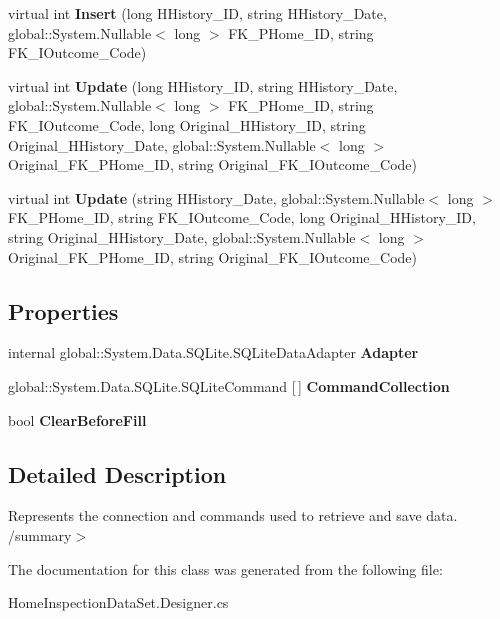 \begin{DoxyCompactItemize}
virtual int {\bfseries Insert} (long H\+History\+\_\+\+ID, string H\+History\+\_\+\+Date, global\+::\+System.\+Nullable$<$ long $>$ F\+K\+\_\+\+P\+Home\+\_\+\+ID, string F\+K\+\_\+\+I\+Outcome\+\_\+\+Code)
\item 
\mbox{\label{class_a_f_h___scheduler_1_1_home_inspection_data_set_table_adapters_1_1_home___history_table_adapter_a3843d8d80b5396ba0462ae6926d66d0a}} 
virtual int {\bfseries Update} (long H\+History\+\_\+\+ID, string H\+History\+\_\+\+Date, global\+::\+System.\+Nullable$<$ long $>$ F\+K\+\_\+\+P\+Home\+\_\+\+ID, string F\+K\+\_\+\+I\+Outcome\+\_\+\+Code, long Original\+\_\+\+H\+History\+\_\+\+ID, string Original\+\_\+\+H\+History\+\_\+\+Date, global\+::\+System.\+Nullable$<$ long $>$ Original\+\_\+\+F\+K\+\_\+\+P\+Home\+\_\+\+ID, string Original\+\_\+\+F\+K\+\_\+\+I\+Outcome\+\_\+\+Code)
\item 
\mbox{\label{class_a_f_h___scheduler_1_1_home_inspection_data_set_table_adapters_1_1_home___history_table_adapter_a89be3cae6fc1e831349998e36e455e00}} 
virtual int {\bfseries Update} (string H\+History\+\_\+\+Date, global\+::\+System.\+Nullable$<$ long $>$ F\+K\+\_\+\+P\+Home\+\_\+\+ID, string F\+K\+\_\+\+I\+Outcome\+\_\+\+Code, long Original\+\_\+\+H\+History\+\_\+\+ID, string Original\+\_\+\+H\+History\+\_\+\+Date, global\+::\+System.\+Nullable$<$ long $>$ Original\+\_\+\+F\+K\+\_\+\+P\+Home\+\_\+\+ID, string Original\+\_\+\+F\+K\+\_\+\+I\+Outcome\+\_\+\+Code)
\end{DoxyCompactItemize}
\subsection*{Properties}
\begin{DoxyCompactItemize}
\item 
\mbox{\label{class_a_f_h___scheduler_1_1_home_inspection_data_set_table_adapters_1_1_home___history_table_adapter_a1afbfe49585941731cb150ecba42cb45}} 
internal global\+::\+System.\+Data.\+S\+Q\+Lite.\+S\+Q\+Lite\+Data\+Adapter {\bfseries Adapter}\hspace{0.3cm}{\ttfamily  [get]}
\item 
\mbox{\label{class_a_f_h___scheduler_1_1_home_inspection_data_set_table_adapters_1_1_home___history_table_adapter_af75a8f7f9426fa258e3df1fdb96903af}} 
global\+::\+System.\+Data.\+S\+Q\+Lite.\+S\+Q\+Lite\+Command [$\,$] {\bfseries Command\+Collection}\hspace{0.3cm}{\ttfamily  [get]}
\item 
\mbox{\label{class_a_f_h___scheduler_1_1_home_inspection_data_set_table_adapters_1_1_home___history_table_adapter_a0c2769eddf61f880cc2cf5c2ecc29108}} 
bool {\bfseries Clear\+Before\+Fill}\hspace{0.3cm}{\ttfamily  [get, set]}
\end{DoxyCompactItemize}


\subsection{Detailed Description}
Represents the connection and commands used to retrieve and save data. /summary$>$ 

The documentation for this class was generated from the following file\+:\begin{DoxyCompactItemize}
\item 
Home\+Inspection\+Data\+Set.\+Designer.\+cs\end{DoxyCompactItemize}
